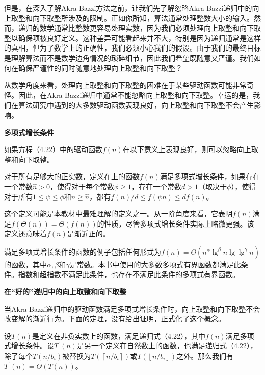 \documentclass[lang=cn,newtx,10pt,scheme=chinese]{elegantbook}
\begin{document}
但是，在深入了解Akra-Bazzi方法之前，让我们先了解忽略Akra-Bazzi递归中的向上取整和向下取整所涉及的限制。正如你所知，算法通常处理整数大小的输入。然而，递归的数学通常比整数更容易处理实数，因为我们必须处理向上取整和向下取整以确保项被良好定义。这种差异可能看起来并不大，特别是因为递归通常是这样的真相，但为了数学上的正确性，我们必须小心我们的假设。由于我们的最终目标是理解算法而不是数学边角情况的琐碎细节，因此我们希望既随意又严谨。我们如何在确保严谨性的同时随意地处理向上取整和向下取整？

从数学角度来看，处理向上取整和向下取整的困难在于某些驱动函数可能非常奇怪。因此，在Akra-Bazzi递归中通常不能忽略向上取整和向下取整。幸运的是，我们在算法研究中遇到的大多数驱动函数表现良好，向上取整和向下取整不会产生影响。

\textbf{多项式增长条件}

如果方程（4.22）中的驱动函数$f(n)$在以下意义上表现良好，则可以忽略向上取整和向下取整。

\begin{tcolorbox}
对于所有足够大的正实数，定义在上的函数$f(n)$满足多项式增长条件，如果存在一个常数$\hat{n}>0$，使得对于每个常数$\phi \geq 1$，存在一个常数$d>1$（取决于$\phi$），使得对于所有$1 \leq \psi \leq \phi$和$n \geq \hat{n}$，都有$f(n) / d \leq f(\psi n) \leq d f(n)$。
\end{tcolorbox}

这个定义可能是本教材中最难理解的定义之一。从一阶角度来看，它表明$f(n)$满足$f(\Theta(n))=\Theta(f(n))$的性质，尽管多项式增长条件实际上略微更强。该定义还意味着$f(n)$是渐近正的。

满足多项式增长条件的函数的例子包括任何形式为$f(n)=\Theta\left(n^\alpha \lg ^\beta n \lg \lg ^\gamma n\right)$的函数，其中$\alpha, \beta$和$\gamma$是常数。本书中使用的大多数多项式有界函数都满足此条件。指数和超指数不满足此条件，也存在不满足此条件的多项式有界函数。

\textbf{在“好的”递归中的向上取整和向下取整}

当Akra-Bazzi递归中的驱动函数满足多项式增长条件时，向上取整和向下取整不会改变解的渐近行为。下面的定理，没有给出证明，正式化了这个概念。

\begin{theorem}{}{}
设$T(n)$是定义在非负实数上的函数，满足递归式（4.22），其中$f(n)$满足多项式增长条件。设$T^{\prime}(n)$是另一个定义在自然数上的函数，也满足递归式（4.22），除了每个$T\left(n / b_i\right)$被替换为$T\left(\left\lceil n / b_i\right\rceil\right)$或$T\left(\left\lfloor n / b_i\right\rfloor\right)$之外。那么我们有$T^{\prime}(n)=\Theta(T(n))$。
\end{theorem}
\end{document}
